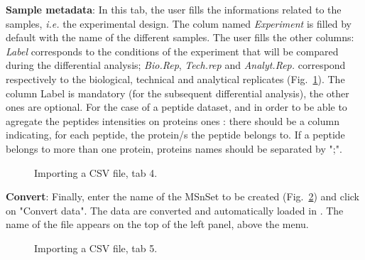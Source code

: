\documentclass[12pt]{article}
\begin{document}
\textbf {Sample metadata}: In this tab, the user fills the informations 
related to the samples, \textit{i.e.} the experimental design. The colum named 
\emph{Experiment} is filled by default with the name of the different samples. 
The user fills the other columns: 
\emph{Label} corresponds to the conditions of the experiment that will be 
compared during the differential analysis; \emph{Bio.Rep}, \emph{Tech.rep} 
and \emph{Analyt.Rep.} correspond respectively to the biological, technical 
and analytical replicates (Fig.~\ref{fig:imp4}). The column Label is 
mandatory (for the subsequent differential analysis), the other ones are 
optional.
\newline For the case of a peptide dataset, and in order to be able to agregate
the peptides intensities on proteins ones : there should be a column indicating,
for each peptide, the protein/s the peptide belongs to. If a peptide belongs to
more than one protein, proteins names should be separated by ";".  
\begin {figure}
\centering
{}
\caption{Importing a CSV file, tab 4.}\label{fig:imp4}
\end {figure}

\textbf {Convert}: Finally, enter the name of the MSnSet to be created 
(Fig.~\ref{fig:imp5}) and click on "Convert data". The data are converted 
and automatically loaded in . The name of the file appears 
on the top of the left panel, above the menu.
\begin {figure}
\centering
{}
\caption{Importing a CSV file, tab 5.}\label{fig:imp5}
\end {figure}
\end{document}
